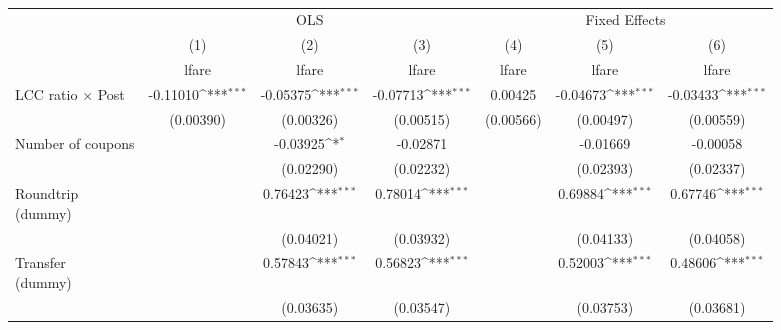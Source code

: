 \begin{table}[htbp]\centering
\def\sym#1{\ifmmode^{#1}\else\(^{#1}\)\fi}
\caption{ \label{post4fare\_nonASVX}}
\begin{tabular}{l*{6}{c}}
\toprule
                    &\multicolumn{3}{c}{OLS}                                          &\multicolumn{3}{c}{Fixed Effects}                                \\\cmidrule(lr){2-4}\cmidrule(lr){5-7}
                    &\multicolumn{1}{c}{(1)}&\multicolumn{1}{c}{(2)}&\multicolumn{1}{c}{(3)}&\multicolumn{1}{c}{(4)}&\multicolumn{1}{c}{(5)}&\multicolumn{1}{c}{(6)}\\
                    &\multicolumn{1}{c}{lfare}&\multicolumn{1}{c}{lfare}&\multicolumn{1}{c}{lfare}&\multicolumn{1}{c}{lfare}&\multicolumn{1}{c}{lfare}&\multicolumn{1}{c}{lfare}\\
\midrule
LCC ratio $\times$ Post&    -0.11010\sym{***}&    -0.05375\sym{***}&    -0.07713\sym{***}&     0.00425         &    -0.04673\sym{***}&    -0.03433\sym{***}\\
                    &   (0.00390)         &   (0.00326)         &   (0.00515)         &   (0.00566)         &   (0.00497)         &   (0.00559)         \\
\addlinespace
Number of coupons   &                     &    -0.03925\sym{*}  &    -0.02871         &                     &    -0.01669         &    -0.00058         \\
                    &                     &   (0.02290)         &   (0.02232)         &                     &   (0.02393)         &   (0.02337)         \\
\addlinespace
\shortstack{Roundtrip \\ (dummy)}&                     &     0.76423\sym{***}&     0.78014\sym{***}&                     &     0.69884\sym{***}&     0.67746\sym{***}\\
                    &                     &   (0.04021)         &   (0.03932)         &                     &   (0.04133)         &   (0.04058)         \\
\addlinespace
\shortstack{Transfer \\ (dummy)}&                     &     0.57843\sym{***}&     0.56823\sym{***}&                     &     0.52003\sym{***}&     0.48606\sym{***}\\
                    &                     &   (0.03635)         &   (0.03547)         &                     &   (0.03753)         &   (0.03681)         \\

\end{tabular}
\end{table}
